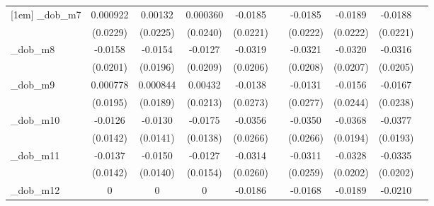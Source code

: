 \begin{table}[htbp]
\begin{tabular}{l*{9}{c}}
[1em]
\_dob\_m7     &    0.000922         &     0.00132         &    0.000360         &     -0.0185         &                     &     -0.0185         &     -0.0189         &     -0.0188         &                     \\
            &    (0.0229)         &    (0.0225)         &    (0.0240)         &    (0.0221)         &                     &    (0.0222)         &    (0.0222)         &    (0.0221)         &                     \\
[1em]
\_dob\_m8     &     -0.0158         &     -0.0154         &     -0.0127         &     -0.0319         &                     &     -0.0321         &     -0.0320         &     -0.0316         &                     \\
            &    (0.0201)         &    (0.0196)         &    (0.0209)         &    (0.0206)         &                     &    (0.0208)         &    (0.0207)         &    (0.0205)         &                     \\
[1em]
\_dob\_m9     &    0.000778         &    0.000844         &     0.00432         &     -0.0138         &                     &     -0.0131         &     -0.0156         &     -0.0167         &                     \\
            &    (0.0195)         &    (0.0189)         &    (0.0213)         &    (0.0273)         &                     &    (0.0277)         &    (0.0244)         &    (0.0238)         &                     \\
[1em]
\_dob\_m10    &     -0.0126         &     -0.0130         &     -0.0175         &     -0.0356         &                     &     -0.0350         &     -0.0368\sym{*}  &     -0.0377\sym{*}  &                     \\
            &    (0.0142)         &    (0.0141)         &    (0.0138)         &    (0.0266)         &                     &    (0.0266)         &    (0.0194)         &    (0.0193)         &                     \\
[1em]
\_dob\_m11    &     -0.0137         &     -0.0150         &     -0.0127         &     -0.0314         &                     &     -0.0311         &     -0.0328         &     -0.0335\sym{*}  &                     \\
            &    (0.0142)         &    (0.0140)         &    (0.0154)         &    (0.0260)         &                     &    (0.0259)         &    (0.0202)         &    (0.0202)         &                     \\
[1em]
\_dob\_m12    &           0         &           0         &           0         &     -0.0186         &                     &     -0.0168         &     -0.0189         &     -0.0210         &                     \\

\end{tabular}
\end{table}
